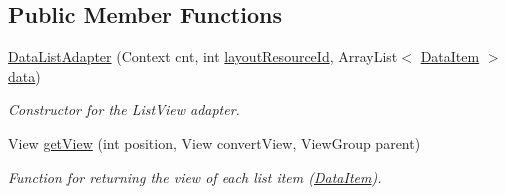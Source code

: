 \subsection*{Public Member Functions}
\begin{DoxyCompactItemize}
\item 
\hyperlink{classcom_1_1jack_1_1motorbikestatistics_1_1_data_list_adapter_aa9aad25299a2df8a357569b6eb3c28b5}{Data\+List\+Adapter} (Context cnt, int \hyperlink{classcom_1_1jack_1_1motorbikestatistics_1_1_data_list_adapter_a03f68396c0f1b8b03feed8d6e3cf115d}{layout\+Resource\+Id}, Array\+List$<$ \hyperlink{classcom_1_1jack_1_1motorbikestatistics_1_1_data_item}{Data\+Item} $>$ \hyperlink{classcom_1_1jack_1_1motorbikestatistics_1_1_data_list_adapter_a1e45ca05e79075976732ea14de9fbc5d}{data})
\begin{DoxyCompactList}\small\item\em Constructor for the List\+View adapter. \end{DoxyCompactList}\item 
View \hyperlink{classcom_1_1jack_1_1motorbikestatistics_1_1_data_list_adapter_a724cb5f4a43bba97dbfdbc08aa9e3015}{get\+View} (int position, View convert\+View, View\+Group parent)
\begin{DoxyCompactList}\small\item\em Function for returning the view of each list item (\hyperlink{classcom_1_1jack_1_1motorbikestatistics_1_1_data_item}{Data\+Item}). \end{DoxyCompactList}\end{DoxyCompactItemize}

